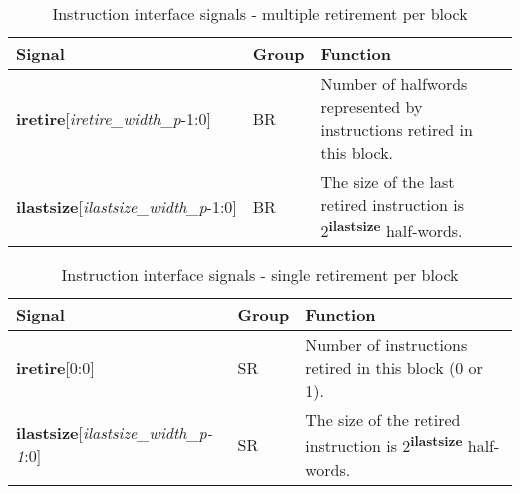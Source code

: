 \begin{table}[htp]
    \centering
    \caption{Instruction interface signals - multiple retirement per block}
    \label{tab:multi-ingress}
    \begin{tabulary}{\textwidth}{|l|l|p{80mm}|}
        \hline
        \textbf{Signal} & \textbf{Group} & \textbf{Function} \\
        \hline
        \textbf{iretire}[\textit{iretire\_width\_p}-1:0] & BR & Number of halfwords represented by instructions retired in this block.\\
        \hline
        \textbf{ilastsize}[\textit{ilastsize\_width\_p}-1:0] & BR & The size of the last retired instruction is 2\textsuperscript{\textbf{ilastsize}} half-words.\\
        \hline
    \end{tabulary}
\end{table}

\begin{table}[htp]
    \centering
    \caption{Instruction interface signals - single retirement per block}
    \label{tab:single-ingress}
    \begin{tabulary}{\textwidth}{|l|l|p{80mm}|}
        \hline
        \textbf{Signal} & \textbf{Group} & \textbf{Function} \\
        \hline
        \textbf{iretire}[0:0] & SR & Number of instructions retired in this block (0 or 1).\\
        \hline
        \textbf{ilastsize}[\textit{ilastsize\_width\_p-1}:0] & SR & The size of the retired instruction is 2\textsuperscript{\textbf{ilastsize}} half-words.\\
        \hline
    \end{tabulary}
\end{table}

